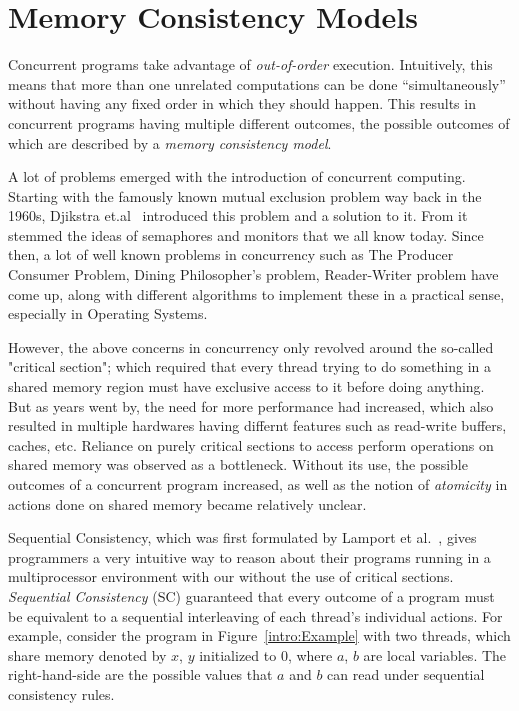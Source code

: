 \section{Memory Consistency Models}

Concurrent programs take advantage of \textit{out-of-order} execution. Intuitively, this means that more than one unrelated computations can be done ``simultaneously'' without having any fixed order in which they should happen.
This results in concurrent programs having multiple different outcomes, the possible outcomes of which are described by
a \textit{memory consistency model}. 

A lot of problems emerged with the introduction of concurrent computing. 
Starting with the famously known mutual exclusion problem way back in the 1960s, Djikstra et.al~\cite{Djikstra} introduced this problem and a solution to it. From it stemmed the ideas of semaphores and monitors that we all know today.  
Since then, a lot of well known problems in concurrency such as The Producer Consumer Problem, Dining Philosopher's problem, Reader-Writer problem have come up, along with different algorithms to implement these in a practical sense, especially in Operating Systems. 

However, the above concerns in concurrency only revolved around the so-called "critical section"; which required that every thread trying to do something in a shared memory region must have exclusive access to it before doing anything. 
But as years went by, the need for more performance had increased, which also resulted in multiple hardwares having differnt features such as read-write buffers, caches, etc. 
Reliance on purely critical sections to access perform operations on shared memory was observed as a bottleneck. 
Without its use, the possible outcomes of a concurrent program increased, as well as the notion of \textit{atomicity} in actions done on shared memory became relatively unclear.  

Sequential Consistency, which was first formulated by Lamport et al.~\cite{Lamport79}, gives programmers a very intuitive way to reason about their programs running in a multiprocessor environment with our without the use of critical sections.
\textit{Sequential Consistency} (SC) guaranteed that every outcome of a program must be equivalent to a sequential interleaving of each thread's individual actions. 
For example, consider the program in Figure~\ref{intro:Example} with two threads, which share memory denoted by $x$, $y$ initialized to 0, where $a$, $b$ are local variables. The right-hand-side are the possible values that $a$ and $b$ can read under sequential consistency rules.

